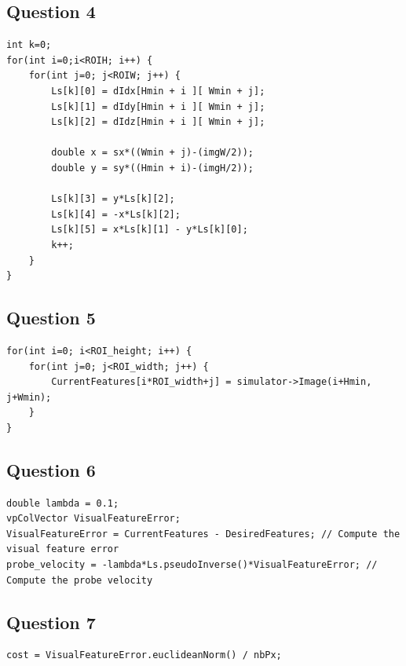 \documentclass[a4paper,11pt]{article}
\begin{document}
\subsection{Question 4}
\begin{verbatim}
int k=0;
for(int i=0;i<ROIH; i++) {
	for(int j=0; j<ROIW; j++) {
		Ls[k][0] = dIdx[Hmin + i ][ Wmin + j];
        Ls[k][1] = dIdy[Hmin + i ][ Wmin + j];
        Ls[k][2] = dIdz[Hmin + i ][ Wmin + j];

        double x = sx*((Wmin + j)-(imgW/2));
        double y = sy*((Hmin + i)-(imgH/2));

        Ls[k][3] = y*Ls[k][2];
        Ls[k][4] = -x*Ls[k][2];
        Ls[k][5] = x*Ls[k][1] - y*Ls[k][0];
        k++;
	}
}
\end{verbatim}

\subsection{Question 5}
\begin{verbatim}
for(int i=0; i<ROI_height; i++) {
	for(int j=0; j<ROI_width; j++) {
		CurrentFeatures[i*ROI_width+j] = simulator->Image(i+Hmin, j+Wmin);
	}
}
\end{verbatim}

\subsection{Question 6}
\begin{verbatim}
double lambda = 0.1;
vpColVector VisualFeatureError;
VisualFeatureError = CurrentFeatures - DesiredFeatures; // Compute the visual feature error
probe_velocity = -lambda*Ls.pseudoInverse()*VisualFeatureError; // Compute the probe velocity
\end{verbatim}

\subsection{Question 7}
\begin{verbatim}
cost = VisualFeatureError.euclideanNorm() / nbPx;
\end{verbatim}
\end{document}
